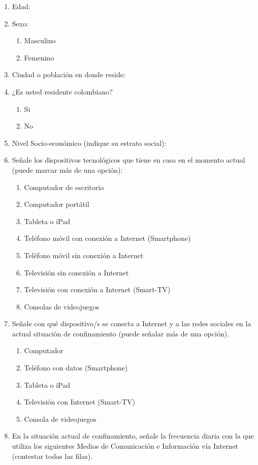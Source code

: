 \documentclass[spanish]{textolivre}
\begin{document}
\begin{enumerate}
    \item Edad:
    \item Sexo:
    \begin{enumerate}
        \item Masculino
        \item Femenino
    \end{enumerate}
    \item Ciudad o población en donde reside:
    \item ¿Es usted residente colombiano?
    \begin{enumerate}
        \item Si
        \item No
    \end{enumerate}
    \item Nivel Socio-económico (indique su estrato social):
    \item Señale los dispositivos tecnológicos que tiene en casa en el momento actual (puede marcar más de una opción):
    \begin{enumerate}
        \item Computador de escritorio
        \item Computador portátil
        \item Tableta o iPad
        \item Teléfono móvil con conexión a Internet (Smartphone)
        \item Teléfono móvil sin conexión a Internet
        \item Televisión sin conexión a Internet
        \item Televisión con conexión a Internet (Smart-TV)
        \item Consolas de videojuegos
    \end{enumerate}
    \item Señale con qué dispositivo/s se conecta a Internet y a las redes sociales en la actual situación de confinamiento (puede señalar más de una opción).
    \begin{enumerate}
        \item Computador
        \item Teléfono con datos (Smartphone)
        \item Tableta o iPad
        \item Televisión con Internet (Smart-TV)
        \item Consola de videojuegos
    \end{enumerate}
    \item En la situación actual de confinamiento, señale la frecuencia diaria con la que utiliza los siguientes Medios de Comunicación e Información vía Internet (contestar todas las filas).
   

\end{enumerate}
\end{document}
